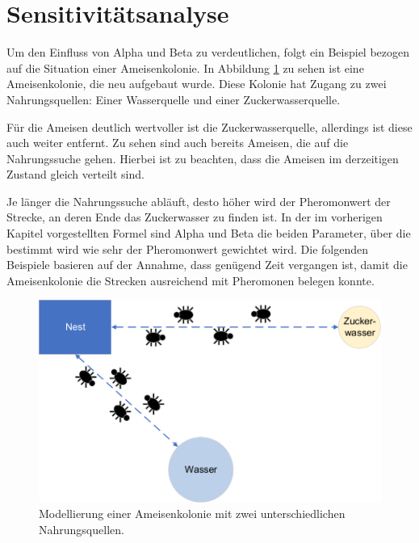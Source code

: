 \section{Sensitivitätsanalyse}{
	\label{analyse}
	Um den Einfluss von Alpha und Beta zu verdeutlichen, folgt ein Beispiel bezogen auf die Situation einer Ameisenkolonie. In Abbildung \ref{parameter_start} zu sehen ist eine Ameisenkolonie, die neu aufgebaut wurde. Diese Kolonie hat Zugang zu zwei Nahrungsquellen: Einer Wasserquelle und einer Zuckerwasserquelle. 
	
	Für die Ameisen deutlich wertvoller ist die Zuckerwasserquelle, allerdings ist diese auch weiter entfernt. Zu sehen sind auch bereits Ameisen, die auf die Nahrungssuche gehen. Hierbei ist zu beachten, dass die Ameisen im derzeitigen Zustand gleich verteilt sind.
	
	Je länger die Nahrungssuche abläuft, desto höher wird der Pheromonwert der Strecke, an deren Ende das Zuckerwasser zu finden ist. In der im vorherigen Kapitel vorgestellten Formel sind Alpha und Beta die beiden Parameter, über die bestimmt wird wie sehr der Pheromonwert gewichtet wird. Die folgenden Beispiele basieren auf der Annahme, dass genügend Zeit vergangen ist, damit die Ameisenkolonie die Strecken ausreichend mit Pheromonen belegen konnte.
	
	\begin{figure}[h]
		\centering
		\includegraphics[width=0.6\linewidth]{images/AntAlgorithm_start.png}
		\caption{Modellierung einer Ameisenkolonie mit zwei unterschiedlichen Nahrungsquellen.}
		\label{parameter_start}
	\end{figure}
	
}
